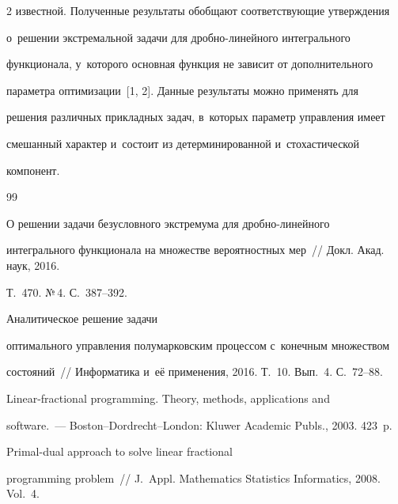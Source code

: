 \begin{multicols}{2}
известной. Полученные результаты обобщают со\-от\-вет\-ст\-ву\-ющие утверж\-де\-ния 

о~решении экстремальной задачи для дроб\-но-ли\-ней\-но\-го интегрального 

функционала, у~которого основная функция не зависит от дополнительного 

па\-ра\-мет\-ра оптимизации~[1, 2]. Данные результаты можно применять для 

решения различных прикладных задач, в~которых параметр управ\-ле\-ния имеет 

смешанный характер и~состоит из детерминированной и~стохастической 

компонент.

     

{\small\frenchspacing

 {%


 \begin{thebibliography}{99}

    


   О решении задачи безусловного экстремума для дробно-линейного 

интегрального функционала на множестве вероятностных мер~// Докл. Акад. наук, 2016. 

Т.~470. №\,4. С.~387--392.


   Аналитическое решение задачи 

оптимального управления полумарковским процессом с~конечным множеством 

состояний~// Информатика и~её применения, 2016. Т.~10. Вып.~4. С.~72--88.


   Linear-fractional programming. Theory, methods, applications and 

software.~--- Boston--Dordrecht--London: Kluwer Academic Publs., 2003. 423~p.

  


   Primal-dual approach to solve linear fractional 

programming problem~// J.~Appl. Mathematics Statistics Informatics, 2008. Vol.~4. 


\end{thebibliography}}}
\end{multicols}
